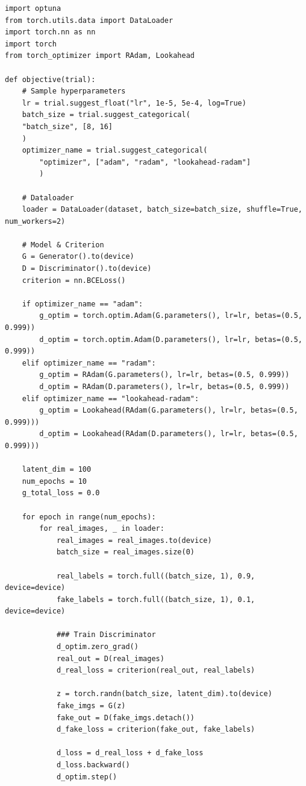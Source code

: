 \documentclass[a4paper, journal]{IEEEtran}
\begin{document}
\begin{lstlisting}[caption=Hyperparameter Optimization with Optuna]
import optuna
from torch.utils.data import DataLoader
import torch.nn as nn
import torch
from torch_optimizer import RAdam, Lookahead

def objective(trial):
    # Sample hyperparameters
    lr = trial.suggest_float("lr", 1e-5, 5e-4, log=True)
    batch_size = trial.suggest_categorical(
    "batch_size", [8, 16]
    )
    optimizer_name = trial.suggest_categorical(
        "optimizer", ["adam", "radam", "lookahead-radam"]
        )
    
    # Dataloader
    loader = DataLoader(dataset, batch_size=batch_size, shuffle=True, num_workers=2)
    
    # Model & Criterion
    G = Generator().to(device)
    D = Discriminator().to(device)
    criterion = nn.BCELoss()
    
    if optimizer_name == "adam":
        g_optim = torch.optim.Adam(G.parameters(), lr=lr, betas=(0.5, 0.999))
        d_optim = torch.optim.Adam(D.parameters(), lr=lr, betas=(0.5, 0.999))
    elif optimizer_name == "radam":
        g_optim = RAdam(G.parameters(), lr=lr, betas=(0.5, 0.999))
        d_optim = RAdam(D.parameters(), lr=lr, betas=(0.5, 0.999))
    elif optimizer_name == "lookahead-radam":
        g_optim = Lookahead(RAdam(G.parameters(), lr=lr, betas=(0.5, 0.999)))
        d_optim = Lookahead(RAdam(D.parameters(), lr=lr, betas=(0.5, 0.999)))
    
    latent_dim = 100
    num_epochs = 10
    g_total_loss = 0.0
    
    for epoch in range(num_epochs):
        for real_images, _ in loader:
            real_images = real_images.to(device)
            batch_size = real_images.size(0)

            real_labels = torch.full((batch_size, 1), 0.9, device=device)
            fake_labels = torch.full((batch_size, 1), 0.1, device=device)

            ### Train Discriminator
            d_optim.zero_grad()
            real_out = D(real_images)
            d_real_loss = criterion(real_out, real_labels)

            z = torch.randn(batch_size, latent_dim).to(device)
            fake_imgs = G(z)
            fake_out = D(fake_imgs.detach())
            d_fake_loss = criterion(fake_out, fake_labels)

            d_loss = d_real_loss + d_fake_loss
            d_loss.backward()
            d_optim.step()


\end{lstlisting}
\end{document}
